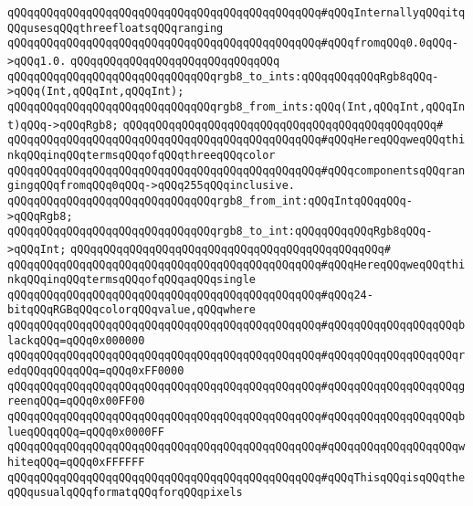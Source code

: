 \verb|qQQqqQQqqQQqqQQqqQQqqQQqqQQqqQQqqQQqqQQqqQQqqQQq#qQQqInternallyqQQqitqQQqusesqQQqthreefloatsqQQqranging|\newline
\verb|qQQqqQQqqQQqqQQqqQQqqQQqqQQqqQQqqQQqqQQqqQQqqQQq#qQQqfromqQQq0.0qQQq->qQQq1.0.|\newline
\verb|qQQqqQQqqQQqqQQqqQQqqQQqqQQqqQQq|\newline
\verb|qQQqqQQqqQQqqQQqqQQqqQQqqQQqqQQqrgb8_to_ints:qQQqqQQqqQQqRgb8qQQq->qQQq(Int,qQQqInt,qQQqInt);|\newline
\verb|qQQqqQQqqQQqqQQqqQQqqQQqqQQqqQQqrgb8_from_ints:qQQq(Int,qQQqInt,qQQqInt)qQQq->qQQqRgb8;|\newline
\verb|qQQqqQQqqQQqqQQqqQQqqQQqqQQqqQQqqQQqqQQqqQQqqQQq#|\newline
\verb|qQQqqQQqqQQqqQQqqQQqqQQqqQQqqQQqqQQqqQQqqQQqqQQq#qQQqHereqQQqweqQQqthinkqQQqinqQQqtermsqQQqofqQQqthreeqQQqcolor|\newline
\verb|qQQqqQQqqQQqqQQqqQQqqQQqqQQqqQQqqQQqqQQqqQQqqQQq#qQQqcomponentsqQQqrangingqQQqfromqQQq0qQQq->qQQq255qQQqinclusive.|\newline
\newline
\verb|qQQqqQQqqQQqqQQqqQQqqQQqqQQqqQQqrgb8_from_int:qQQqIntqQQqqQQq->qQQqRgb8;|\newline
\verb|qQQqqQQqqQQqqQQqqQQqqQQqqQQqqQQqrgb8_to_int:qQQqqQQqqQQqRgb8qQQq->qQQqInt;|\newline
\verb|qQQqqQQqqQQqqQQqqQQqqQQqqQQqqQQqqQQqqQQqqQQqqQQq#|\newline
\verb|qQQqqQQqqQQqqQQqqQQqqQQqqQQqqQQqqQQqqQQqqQQqqQQq#qQQqHereqQQqweqQQqthinkqQQqinqQQqtermsqQQqofqQQqaqQQqsingle|\newline
\verb|qQQqqQQqqQQqqQQqqQQqqQQqqQQqqQQqqQQqqQQqqQQqqQQq#qQQq24-bitqQQqRGBqQQqcolorqQQqvalue,qQQqwhere|\newline
\verb|qQQqqQQqqQQqqQQqqQQqqQQqqQQqqQQqqQQqqQQqqQQqqQQq#qQQqqQQqqQQqqQQqqQQqblackqQQq=qQQq0x000000|\newline
\verb|qQQqqQQqqQQqqQQqqQQqqQQqqQQqqQQqqQQqqQQqqQQqqQQq#qQQqqQQqqQQqqQQqqQQqredqQQqqQQqqQQq=qQQq0xFF0000|\newline
\verb|qQQqqQQqqQQqqQQqqQQqqQQqqQQqqQQqqQQqqQQqqQQqqQQq#qQQqqQQqqQQqqQQqqQQqgreenqQQq=qQQq0x00FF00|\newline
\verb|qQQqqQQqqQQqqQQqqQQqqQQqqQQqqQQqqQQqqQQqqQQqqQQq#qQQqqQQqqQQqqQQqqQQqblueqQQqqQQq=qQQq0x0000FF|\newline
\verb|qQQqqQQqqQQqqQQqqQQqqQQqqQQqqQQqqQQqqQQqqQQqqQQq#qQQqqQQqqQQqqQQqqQQqwhiteqQQq=qQQq0xFFFFFF|\newline
\verb|qQQqqQQqqQQqqQQqqQQqqQQqqQQqqQQqqQQqqQQqqQQqqQQq#qQQqThisqQQqisqQQqtheqQQqusualqQQqformatqQQqforqQQqpixels|\newline

